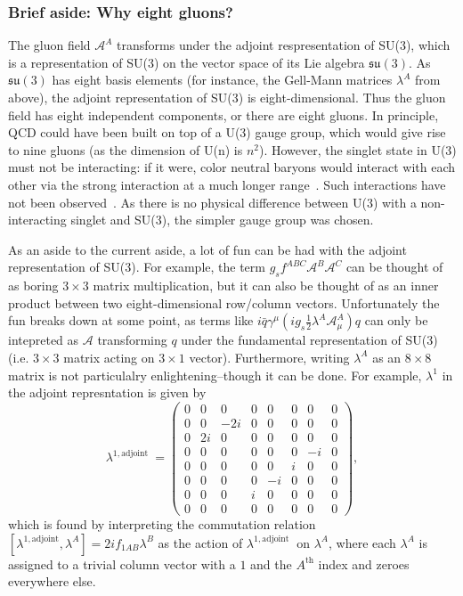 \subsubsection{Brief aside: Why eight gluons?}
\label{sec:why_eight_gluons}

The gluon field $\mathcal{A}^A$ transforms under the adjoint respresentation of SU(3), which is a representation of SU(3) on the vector space of its Lie algebra $\mathfrak{su}(3)$. As $\mathfrak{su}(3)$ has eight basis elements (for instance, the Gell-Mann matrices $\lambda^A$ from above), the adjoint representation of SU(3) is eight-dimensional. Thus the gluon field has eight independent components, or there are eight gluons. In principle, QCD could have been built on top of a U(3) gauge group, which would give rise to nine gluons (as the dimension of U(n) is $n^2$). However, the singlet state in U(3) must not be interacting: if it were, color neutral baryons would interact with each other via the strong interaction at a much longer range~\cite{SingletGluons}. Such interactions have not been observed~\cite{SingletGluons2}. As there is no physical difference between U(3) with a non-interacting singlet and SU(3), the simpler gauge group was chosen. 

As an aside to the current aside, a lot of fun can be had with the adjoint representation of SU(3). For example, the term $g_s f^{ABC} \mathcal{A}^B \mathcal{A}^C$  can be thought of as boring $3\times3$ matrix multiplication, but it can also be thought of as an inner product between two eight-dimensional row/column vectors. Unfortunately the fun breaks down at some point, as terms like $i \bar{q} \gamma^\mu (i g_s \frac{1}{2} \lambda^A \mathcal{A}_\mu^A) q$  can only be intepreted as $\mathcal{A}$ transforming $q$ under the fundamental representation of SU(3) (i.e. $3\times3$ matrix acting on $3\times1$ vector). Furthermore, writing $\lambda^A$ as an $8\times8$ matrix is not particulalry enlightening--though it can be done. For example, $\lambda^1$ in the adjoint represntation is given by
%
\begin{equation*}
\lambda^{1, \text {adjoint }}=\left(\begin{array}{cccccccc}
0 & 0 & 0 & 0 & 0 & 0 & 0 & 0 \\
0 & 0 & -2i & 0 & 0 & 0 & 0 & 0 \\
0 & 2i & 0 & 0 & 0 & 0 & 0 & 0 \\
0 & 0 & 0 & 0 & 0 & 0 & -i & 0 \\
0 & 0 & 0 & 0 & 0 & i & 0 & 0 \\
0 & 0 & 0 & 0 & -i & 0 & 0 & 0 \\
0 & 0 & 0 & i & 0 & 0 & 0 & 0 \\
0 & 0 & 0 & 0 & 0 & 0 & 0 & 0
\end{array}\right),
\end{equation*}
which is found by interpreting the commutation relation $[\lambda^{1, \text {adjoint}}, \lambda^A] = 2if_{1AB}\lambda^B$ as the action of $\lambda^{1, \text {adjoint }}$ on $\lambda^A$, where each $\lambda^A$ is assigned to a trivial column vector with a $1$ and the $A^{\text {th}}$ index and zeroes everywhere else.
%


